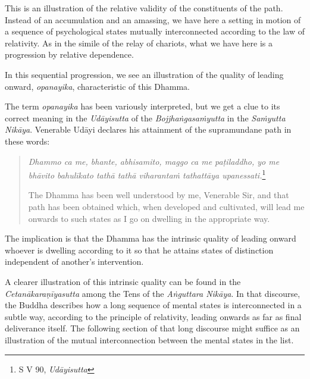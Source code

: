 This is an illustration of the relative validity of the constituents of the path. Instead of an accumulation and an amassing, we have here a setting in motion of a sequence of psychological states mutually interconnected according to the law of relativity. As in the simile of the relay of chariots, what we have here is a progression by relative dependence.

In this sequential progression, we see an illustration of the quality of leading onward, \emph{opanayika}, characteristic of this Dhamma.

The term \emph{opanayika} has been variously interpreted, but we get a clue to its correct meaning in the \emph{Udāyisutta} of the \emph{Bojjhaṅgasaṁyutta} in the \emph{Saṁyutta Nikāya}. Venerable Udāyi declares his attainment of the supramundane path in these words:

\begin{quote}
\emph{Dhammo ca me, bhante, abhisamito, maggo ca me paṭiladdho, yo me bhāvito bahulīkato tathā tathā viharantaṁ tathattāya upanessati.}\footnote{S V 90, \emph{Udāyisutta}}

The Dhamma has been well understood by me, Venerable Sir, and that path has been obtained which, when developed and cultivated, will lead me onwards to such states as I go on dwelling in the appropriate way.
\end{quote}

The implication is that the Dhamma has the intrinsic quality of leading onward whoever is dwelling according to it so that he attains states of distinction independent of another's intervention.

A clearer illustration of this intrinsic quality can be found in the \emph{Cetanākaraṇīyasutta} among the Tens of the \emph{Aṅguttara Nikāya}. In that discourse, the Buddha describes how a long sequence of mental states is interconnected in a subtle way, according to the principle of relativity, leading onwards as far as final deliverance itself. The following section of that long discourse might suffice as an illustration of the mutual interconnection between the mental states in the list.

